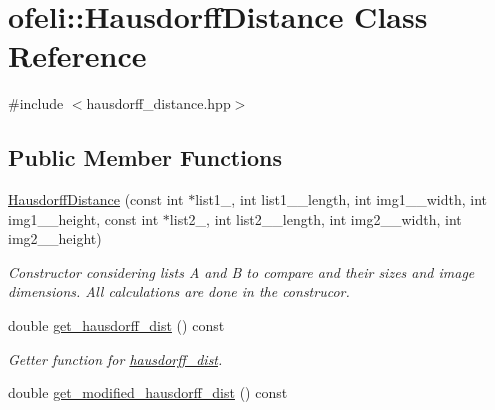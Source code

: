 \hypertarget{classofeli_1_1_hausdorff_distance}{\section{ofeli\-:\-:Hausdorff\-Distance Class Reference}
\label{classofeli_1_1_hausdorff_distance}
}


{\ttfamily \#include $<$hausdorff\-\_\-distance.\-hpp$>$}

\subsection*{Public Member Functions}
\begin{DoxyCompactItemize}
\item 
\hypertarget{classofeli_1_1_hausdorff_distance_a4b1864bb0503e1a3b85bc75100ec1c91}{\hyperlink{classofeli_1_1_hausdorff_distance_a4b1864bb0503e1a3b85bc75100ec1c91}{Hausdorff\-Distance} (const int $\ast$list1\-\_, int list1\-\_\-\_\-length, int img1\-\_\-\_\-width, int img1\-\_\-\_\-height, const int $\ast$list2\-\_, int list2\-\_\-\_\-length, int img2\-\_\-\_\-width, int img2\-\_\-\_\-height)}\label{classofeli_1_1_hausdorff_distance_a4b1864bb0503e1a3b85bc75100ec1c91}

\begin{DoxyCompactList}\small\item\em Constructor considering lists A and B to compare and their sizes and image dimensions. All calculations are done in the construcor. \end{DoxyCompactList}\item 
\hypertarget{classofeli_1_1_hausdorff_distance_aeb09d86b41a000db23138bbd8e2fdd76}{double \hyperlink{classofeli_1_1_hausdorff_distance_aeb09d86b41a000db23138bbd8e2fdd76}{get\-\_\-hausdorff\-\_\-dist} () const }\label{classofeli_1_1_hausdorff_distance_aeb09d86b41a000db23138bbd8e2fdd76}

\begin{DoxyCompactList}\small\item\em Getter function for \hyperlink{classofeli_1_1_hausdorff_distance_a895012cca75a4f37ff0ef376dca57581}{hausdorff\-\_\-dist}. \end{DoxyCompactList}\item 
\hypertarget{classofeli_1_1_hausdorff_distance_a39798b7b04918d27059f9d93f1c3ac7c}{double \hyperlink{classofeli_1_1_hausdorff_distance_a39798b7b04918d27059f9d93f1c3ac7c}{get\-\_\-modified\-\_\-hausdorff\-\_\-dist} () const }\label{classofeli_1_1_hausdorff_distance_a39798b7b04918d27059f9d93f1c3ac7c}


\end{DoxyCompactItemize}
